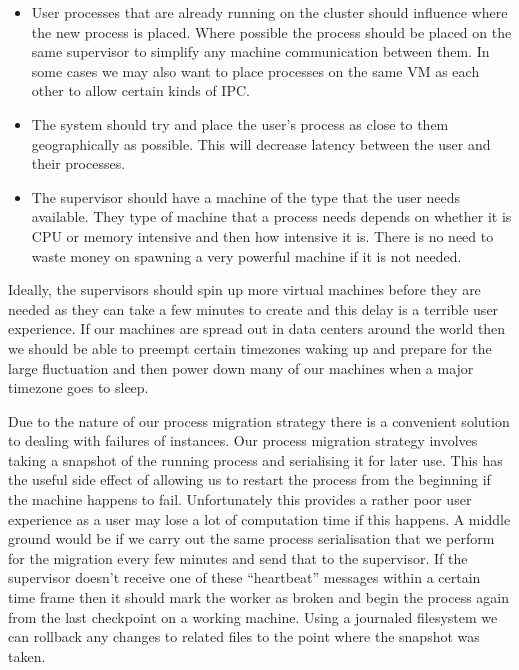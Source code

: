 \documentclass[12pt, a4paper]{article}
\begin{document}
\begin{itemize}

	\item

	User processes that are already running on the cluster should influence
	where the new process is placed. Where possible the process should be
	placed on the same supervisor to simplify any machine communication between
	them. In some cases we may also want to place processes on the same VM as
	each other to allow certain kinds of IPC.

	\item

	The system should try and place the user's process as close to them
	geographically as possible. This will decrease latency between the user and
	their processes.

	\item

	The supervisor should have a machine of the type that the user needs
	available. They type of machine that a process needs depends on whether it
	is CPU or memory intensive and then how intensive it is. There is no need
	to waste money on spawning a very powerful machine if it is not needed.

\end{itemize}

Ideally, the supervisors should spin up more virtual machines before they are
needed as they can take a few minutes to create and this delay is a terrible
user experience. If our machines are spread out in data centers around the
world then we should be able to preempt certain timezones waking up and prepare
for the large fluctuation and then power down many of our machines when a major
timezone goes to sleep.

Due to the nature of our process migration strategy there is a convenient
solution to dealing with failures of instances. Our process migration strategy
involves taking a snapshot of the running process and serialising it for later
use. This has the useful side effect of allowing us to restart the process from
the beginning if the machine happens to fail. Unfortunately this provides
a rather poor user experience as a user may lose a lot of computation time if
this happens. A middle ground would be if we carry out the same process
serialisation that we perform for the migration every few minutes and send that
to the supervisor. If the supervisor doesn't receive one of these ``heartbeat''
messages within a certain time frame then it should mark the worker as broken
and begin the process again from the last checkpoint on a working machine.
Using a journaled filesystem we can rollback any changes to related files to
the point where the snapshot was taken.
\end{document}
